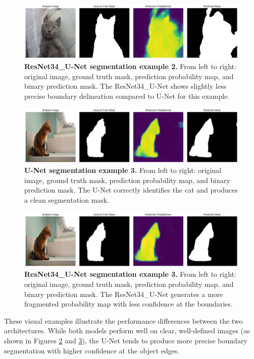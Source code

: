 \documentclass[twocolumn,a4paper]{article}
\begin{document}
\begin{figure}[H]
\centering
\includegraphics[width=0.95\linewidth]{figs/resnet_sample_60_2}
\caption{\textbf{ResNet34\_U-Net segmentation example 2.} From left to right: original image, ground truth mask, prediction probability map, and binary prediction mask. The ResNet34\_U-Net shows slightly less precise boundary delineation compared to U-Net for this example.}
\label{fig:resnetsample602}
\end{figure}
\begin{figure}[H]
\centering
\includegraphics[width=0.95\linewidth]{figs/unet_sample_35_0}
\caption{\textbf{U-Net segmentation example 3.} From left to right: original image, ground truth mask, prediction probability map, and binary prediction mask. The U-Net correctly identifies the cat and produces a clean segmentation mask.}
\label{fig:unetsample350}
\end{figure}
\begin{figure}[H]
\centering
\includegraphics[width=0.95\linewidth]{figs/resnet_sample_35_0}
\caption{\textbf{ResNet34\_U-Net segmentation example 3.} From left to right: original image, ground truth mask, prediction probability map, and binary prediction mask. The ResNet34\_U-Net generates a more fragmented probability map with less confidence at the boundaries.}
\label{fig:resnetsample350}
\end{figure}

These visual examples illustrate the performance differences between the two architectures. While both models perform well on clear, well-defined images (as shown in Figures \ref{fig:unetsample350} and \ref{fig:resnetsample350}), the U-Net tends to produce more precise boundary segmentation with higher confidence at the object edges.
\end{document}
